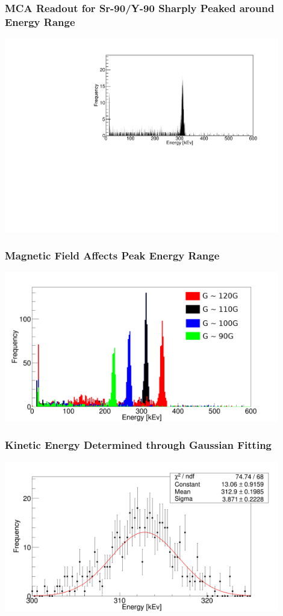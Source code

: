\documentclass{beamer}
\begin{document}
\begin{frame}
  \frametitle{MCA Readout for Sr-90/Y-90 Sharply Peaked around Energy Range}
  \includegraphics[width=12cm]{mca-readout-clean.pdf}
\end{frame}
\begin{frame}
  \frametitle{Magnetic Field Affects Peak Energy Range}
  \includegraphics[width=12cm]{mca-readout-total.png}
\end{frame}

\begin{frame}
  \frametitle{Kinetic Energy Determined through Gaussian Fitting}
  \includegraphics[width=12cm]{gaus.png}
\end{frame}
\end{document}
